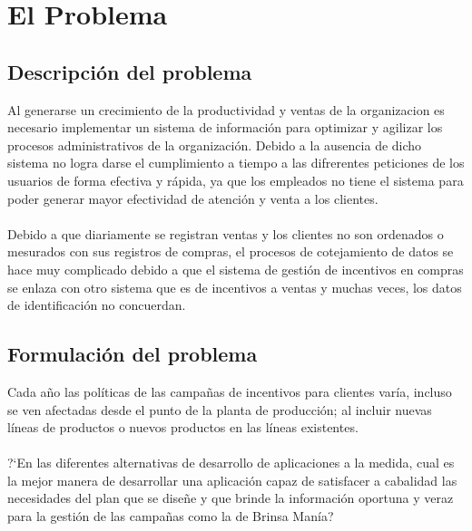 \chapter{El Problema}\label{Problema}
\section{Descripci\'on del problema}
Al generarse un crecimiento de la productividad y ventas de la organizacion es necesario implementar un sistema de informaci\'on para optimizar y agilizar los procesos administrativos de la organizaci\'on.
Debido a la ausencia de dicho sistema no logra darse el cumplimiento a tiempo a las difrerentes peticiones de los usuarios de forma efectiva y r\'apida, ya que los empleados no tiene el sistema para poder generar mayor efectividad de atenci\'on y venta a los clientes. %
\\%
\\%
Debido a que diariamente se registran ventas y los clientes no son ordenados o mesurados con sus registros de compras, el procesos de cotejamiento de datos se hace muy complicado debido a que el sistema de gesti\'on de incentivos en compras se enlaza con otro sistema que es de incentivos a ventas y muchas veces, los datos de identificaci\'on no concuerdan.%

%
\section{Formulaci\'on del problema}
Cada a\~no las pol\'iticas de las campa\~nas de incentivos para clientes var\'ia, incluso se ven afectadas desde el punto de la planta de producci\'on; al incluir nuevas l\'ineas de productos o nuevos productos en las l\'ineas existentes.%
\\%
\\%
?`En las diferentes alternativas de desarrollo de aplicaciones a la medida, cual es la mejor manera de desarrollar una aplicaci\'on capaz de satisfacer a cabalidad las necesidades del plan que se dise\~ne y que brinde la informaci\'on oportuna y veraz para la gesti\'on de las campa\~nas como la de Brinsa Man\'ia?%
%
